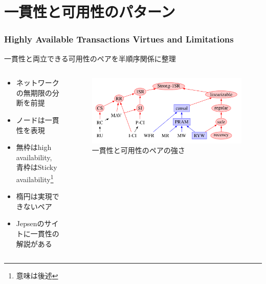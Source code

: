 \documentclass[unicode, 14pt, aspectratio=169]{beamer}
\begin{document}
\section{一貫性と可用性のパターン}
\begin{frame}
  \frametitle{\normalsize{Highly Available Transactions Virtues and Limitations\supercite{high}}}
  {\large 一貫性と両立できる可用性のペアを半順序関係に整理}
  \begin{columns}
    \begin{column}{0.5\textwidth}
      \begin{itemize}
      \item {\small ネットワークの無期限の分断を前提}
      \item {\small ノードは一貫性を表現}
      \item {\small 無枠はhigh availability, 青枠はSticky availability\footnote{意味は後述}}
      \item {\small 楕円は実現できないペア}        
      \item {\small Jepsenのサイトに一貫性の解説がある\supercite{jepsen-models}}
      \end{itemize}
    \end{column}    
    \begin{column}{0.5\textwidth}
      \begin{figure}
        \includegraphics[width=1\textwidth]{images/hat.png}
        \caption{一貫性と可用性のペアの強さ\supercite{high}}
      \end{figure}
    \end{column} 
  \end{columns}
\end{frame}
\end{document}
